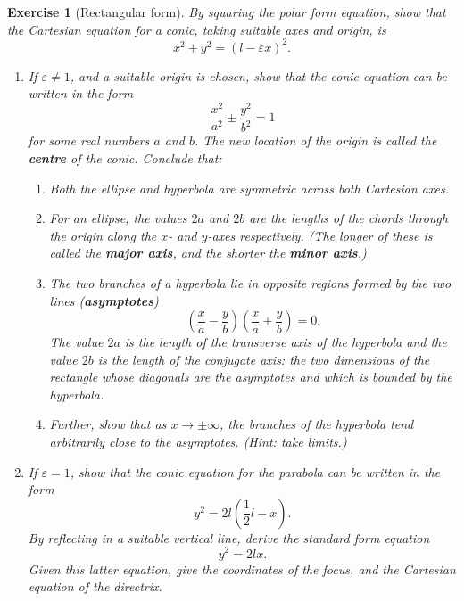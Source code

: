 \documentclass[a4paper,leqno,9pt]{article}
\theoremstyle{exercise}
\newtheorem{Exercise}{Exercise}
\newenvironment{exercise}
  {\begin{mdframed}\begin{Exercise}}
  {\end{Exercise}\end{mdframed}}
\theoremstyle{plain}
\theoremstyle{definition}
\theoremstyle{remark}
\newcommand{\df}{\textbf}
\begin{document}
\begin{exercise}[Rectangular form]
  By squaring the polar form equation, show that the Cartesian equation for a conic, taking suitable axes and origin, is
  \begin{displaymath}
    x^2 + y^2 = (l - \varepsilon x)^2.
  \end{displaymath}
  \begin{enumerate}
    \item If $ \varepsilon \neq 1 $, and a suitable origin is chosen, show that the conic equation can be written in the form
          \begin{displaymath}
            \frac{x^2}{a^2} \pm \frac{y^2}{b^2} = 1
          \end{displaymath}
          for some real numbers $ a $ and $ b $. The new location of the origin is called the \df{centre} of the conic. Conclude that:
          \begin{enumerate}
            \item Both the ellipse and hyperbola are symmetric across both Cartesian axes.
            \item For an ellipse, the values $ 2a $ and $ 2b $ are the lengths of the chords through the origin along the $ x$- and $ y$-axes respectively. (The
                  longer of these is called the \df{major axis}, and the shorter the \df{minor axis}.)
            \item The two branches of a hyperbola lie in opposite regions formed by the two lines (\df{asymptotes})
                    \begin{displaymath}
                      \left(\frac{x}{a} - \frac{y}{b} \right)\left(\frac{x}{a} + \frac{y}{b} \right) = 0.
                    \end{displaymath}
                    The value $ 2a $ is the length of the transverse axis of the hyperbola and the value $ 2b $ is the length of the conjugate
                    axis: the two dimensions of the rectangle whose diagonals are the asymptotes and which is bounded by the hyperbola.
            \item Further, show that as $ x \to \pm\infty $, the branches of the hyperbola tend arbitrarily close to the asymptotes. (Hint: take limits.)
          \end{enumerate}
    \item If $ \varepsilon = 1 $, show that the conic equation for the parabola can be written in the form
          \begin{displaymath}
            y^2 = 2l(\frac{1}{2}l - x).
          \end{displaymath}
          By reflecting in a suitable vertical line, derive the standard form equation
          \begin{displaymath}
            y^2 = 2lx.
          \end{displaymath}
          Given this latter equation, give the coordinates of the focus, and the Cartesian equation of the directrix.
  \end{enumerate}
\end{exercise}
\end{document}
